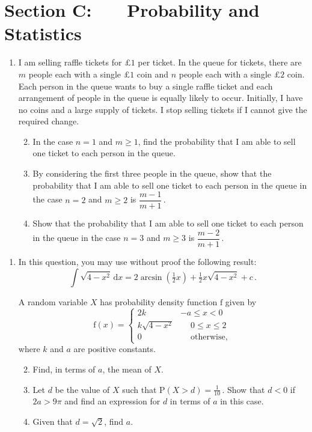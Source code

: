 \documentclass[a4, 11pt]{report}
\newlength{\qspace}
\newcounter{qnumber}
\newenvironment{question}%
 {\vspace{\qspace}
  \begin{enumerate}[\bfseries 1\quad][10]%
    \setcounter{enumi}{\value{qnumber}}%
    \item%
 }
{
  \end{enumerate}
  \filbreak
  \stepcounter{qnumber}
 }
\newenvironment{questionparts}[1][1]%
 {
  \begin{enumerate}[\bfseries (i)]%
    \setcounter{enumii}{#1}
    \addtocounter{enumii}{-1}
    \setlength{\itemsep}{5mm}
    \setlength{\parskip}{8pt}
 }
 {
  \end{enumerate}
 }
\def\d{{\mathrm d}}
\def\f{{\mathrm f}}
\def\P{{\mathrm P}}
\def\le{\leqslant}
\def\ge{\geqslant}
\begin{document}
	
	\newpage
\section*{Section C: \ \ \ Probability and Statistics}


\begin{question}
I am selling raffle tickets for $\pounds1$ per ticket.
In the  queue for tickets,
there are $m$ people each with a single $\pounds1$ coin and $n$
people each with a single $\pounds2$ coin. Each person in the 
queue wants to buy a single raffle ticket and each arrangement
of people in the queue is equally likely to occur.
Initially, I have no coins and
a large supply of tickets. I stop selling tickets if 
I cannot give the required change.

\begin{questionparts}
\item In the case $n=1$ and $m\ge1$, find the probability
that I am able to sell one ticket to each person in the queue.
\item By considering the first three people in the queue, 
show that the probability that I am able to sell one ticket
to each person in the queue in the case $n=2$ and $m\ge2$ is
$\dfrac{m-1}{m+1}\,$.
\item 
Show that the probability that I am able to sell one ticket
to each person in the queue in the case $n=3$ and $m\ge3$ is
$\dfrac{m-2}{m+1}\,$.
\end{questionparts}
\end{question}

\begin{question}
In this question, you may use without proof
the following
result:
\[
\int \sqrt{4-x^2}\, \d x 
= 2 \arcsin (\tfrac12 x ) + \tfrac 12 x \sqrt{4-x^2} +c\,.
\] 

A random variable $X$ has probability
density function $\f$ given by
\[
\f(x) = 
\begin{cases}
2k & -a\le x <0     \\[3mm]
k\sqrt{4-x^2} & \phantom{-} 0\le x \le 2 \\[3mm]
0 & \phantom{-}\text{otherwise},
\end{cases}
\]
where $k$ and $a$ are positive constants.

\begin{questionparts}
\item Find, in terms of $a$, the mean of $X$. 
\item Let $d$ be the value of $X$ such that $\P(X> d)=\frac1 {10}\,$. Show
that $d<0$ if $2a>   9\pi$ and find an expression for $d$ in terms of $a$
in this case.
\item Given that $d=\sqrt 2$, find $a$.
\end{questionparts}
\end{question}
\end{document}
